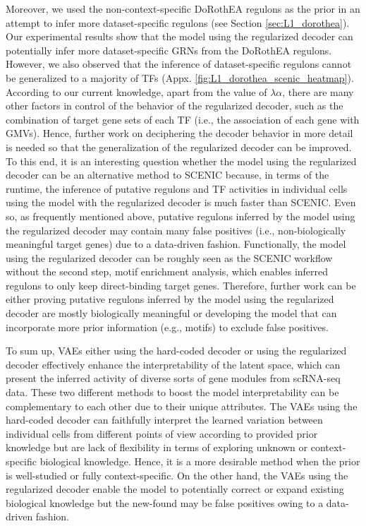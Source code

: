 Moreover, we used the non-context-specific DoRothEA regulons\cite{Garcia-Alonso2019} as the prior in an attempt to infer more dataset-specific regulons (see Section \ref{sec:L1_dorothea}). Our experimental results show that the model using the regularized decoder can potentially infer more dataset-specific GRNs from the DoRothEA regulons. However, we also observed that the inference of dataset-specific regulons cannot be generalized to a majority of TFs (Appx. \ref{fig:L1_dorothea_scenic_heatmap}). According to our current knowledge, apart from the value of $\lambda\alpha$, there are many other factors in control of the behavior of the regularized decoder, such as the combination of target gene sets of each TF (i.e., the association of each gene with GMVs). Hence, further work on deciphering the decoder behavior in more detail is needed so that the generalization of the regularized decoder can be improved. To this end, it is an interesting question whether the model using the regularized decoder can be an alternative method to SCENIC because, in terms of the runtime, the inference of putative regulons and TF activities in individual cells using the model with the regularized decoder is much faster than SCENIC. Even so, as frequently mentioned above, putative regulons inferred by the model using the regularized decoder may contain many false positives (i.e., non-biologically meaningful target genes) due to a data-driven fashion. Functionally, the model using the regularized decoder can be roughly seen as the SCENIC workflow without the second step, motif enrichment analysis, which enables inferred regulons to only keep direct-binding target genes. Therefore, further work can be either proving putative regulons inferred by the model using the regularized decoder are mostly biologically meaningful or developing the model that can incorporate more prior information (e.g., motifs) to exclude false positives.

To sum up, VAEs either using the hard-coded decoder or using the regularized decoder effectively enhance the interpretability of the latent space, which can present the inferred activity of diverse sorts of gene modules from scRNA-seq data. These two different methods to boost the model interpretability can be complementary to each other due to their unique attributes. The VAEs using the hard-coded decoder can faithfully interpret the learned variation between individual cells from different points of view according to provided prior knowledge but are lack of flexibility in terms of exploring unknown or context-specific biological knowledge. Hence, it is a more desirable method when the prior is well-studied or fully context-specific. On the other hand, the VAEs using the regularized decoder enable the model to potentially correct or expand existing biological knowledge but the new-found may be false positives owing to a data-driven fashion.
